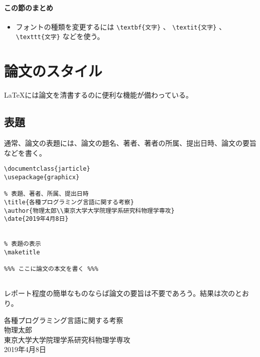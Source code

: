 \paragraph{この節のまとめ}

\begin{itemize}
\item フォントの種類を変更するには \verb|\textbf{文字}| 、 \verb|\textit{文字}| 、\verb|\texttt{文字}| などを使う。
\end{itemize}


\section{論文のスタイル}
\label{sec:latex:style}

\LaTeX には論文を清書するのに便利な機能が備わっている。

\subsection{表題}
\label{sec:latex:title}

通常、論文の表題には、論文の題名、著者、著者の所属、提出日時、論文の要旨などを書く。
\begin{reidai}
\begin{verbatim}
\documentclass{jarticle}
\usepackage{graphicx}

% 表題、著者、所属、提出日時
\title{各種プログラミング言語に関する考察}
\author{物理太郎\\東京大学大学院理学系研究科物理学専攻}
\date{2019年4月8日}


% 表題の表示
\maketitle

%%% ここに論文の本文を書く %%%


\end{verbatim}
\end{reidai} \noindent
レポート程度の簡単なものならば論文の要旨は不要であろう。結果は次のとおり。
\begin{kekka}
  \begin{center}
    {\Large 各種プログラミング言語に関する考察} \\[1.5em]
    物理太郎\\
    東京大学大学院理学系研究科物理学専攻 \\
    2019年4月8日
  \end{center}
\end{kekka}

